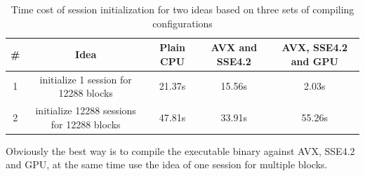 \begin{table}
    \caption{Time cost of session initialization for two ideas based on three sets of compiling configurations}
    \bigskip\label{tab:seesion-init-plain-cpu}
    \centering
    \begin{tabular}{c c c c c}
        \toprule
        \# & Idea & Plain CPU & AVX and SSE4.2 & AVX, SSE4.2 and GPU \\
        \midrule
        1 & initialize 1 session for 12288 blocks & 21.37s &15.56s&2.03s \\
        2 & initialize 12288 sessions for 12288 blocks & 47.81s &33.91s&55.26s\\
        \bottomrule
    \end{tabular}
\end{table}

Obviously the best way is to compile the 
executable binary against AVX, SSE4.2 and GPU, at the same
time use the idea of one session for multiple blocks.

